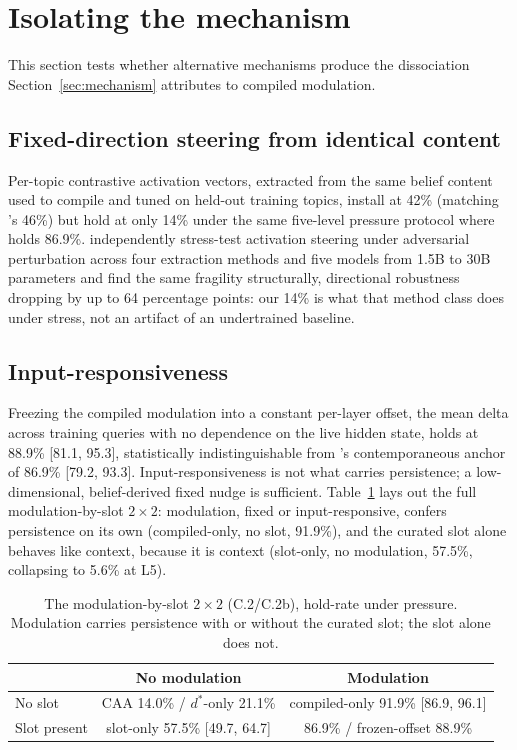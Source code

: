 \iflongversion
\section{Isolating the mechanism}
\label{sec:isolation}

This section tests whether alternative mechanisms produce the dissociation
Section~\ref{sec:mechanism} attributes to compiled modulation.

\subsection{Fixed-direction steering from identical content}
\label{sec:isolation-steering}

Per-topic contrastive activation vectors, extracted from the same belief content used
to compile \condF{} and tuned on held-out training topics, install at 42\% (matching
\condC{}'s 46\%) but hold at only 14\% under the same five-level pressure protocol
where \condF{} holds 86.9\%. \citet{le2026steeringrobustness}
independently stress-test activation steering under adversarial perturbation across
four extraction methods and five models from 1.5B to 30B parameters and find the same
fragility structurally, directional robustness dropping by up to 64 percentage points:
our 14\% is what that method class does under stress, not an artifact of an
undertrained baseline.

\subsection{Input-responsiveness}
\label{sec:isolation-frozen}

Freezing the compiled modulation into a constant per-layer offset, the mean delta
across training queries with no dependence on the live hidden state, holds at 88.9\%
[81.1, 95.3], statistically indistinguishable from \condF{}'s contemporaneous anchor
of 86.9\% [79.2, 93.3]. Input-responsiveness is not what carries
persistence; a low-dimensional, belief-derived fixed nudge is sufficient. Table~\ref{tab:mechanism-2x2}
lays out the full modulation-by-slot \(2\times2\): modulation, fixed or
input-responsive, confers persistence on its own (compiled-only, no slot, 91.9\%), and
the curated slot alone behaves like context, because it is context (slot-only, no
modulation, 57.5\%, collapsing to 5.6\% at L5).

\begin{table}[t]
\centering
\caption{The modulation-by-slot \(2\times2\) (C.2/C.2b), hold-rate under pressure.
Modulation carries persistence with or without the curated slot; the slot alone does
not.}
\label{tab:mechanism-2x2}
\begin{tabular}{lcc}
\toprule
& No modulation & Modulation \\
\midrule
No slot & CAA 14.0\% / \(d^*\)-only 21.1\% & compiled-only 91.9\% [86.9, 96.1] \\
Slot present & slot-only 57.5\% [49.7, 64.7] & \condF{} 86.9\% / frozen-offset 88.9\% \\
\bottomrule
\end{tabular}
\end{table}

